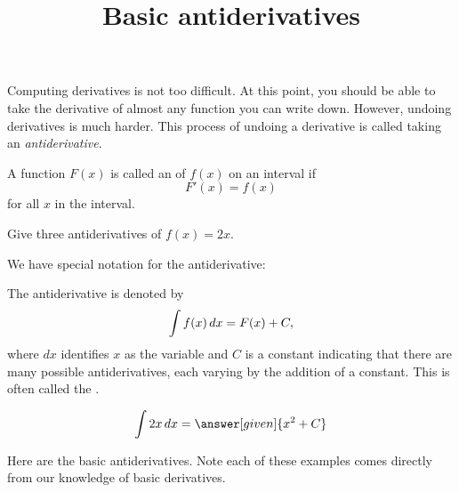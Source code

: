 \documentclass{ximera}
\title[Dig-In:]{Basic antiderivatives}
\begin{document}
\begin{abstract}
\end{abstract}
\maketitle


Computing derivatives is not too difficult. At this point, you should
be able to take the derivative of almost any function you can write
down. However, undoing derivatives is much harder. This process of
undoing a derivative is called taking an \textit{antiderivative}.

\begin{definition}
A function $F(x)$ is called an  of $f(x)$ on an
interval if
\[
F'(x) = f(x)
\]
for all $x$ in the interval.
\end{definition}

\begin{question}
  Give three antiderivatives of $f(x) = 2x$.
\end{question}

We have special notation for the antiderivative:

\begin{definition}
The antiderivative is denoted by
\[
\int f(x) \,d x = F(x)+C,
\]
where $dx$ identifies $x$ as the variable and $C$ is a constant
indicating that there are many possible antiderivatives, each varying by
the addition of a constant.  This is often called the
.
\end{definition}

\begin{example}
  \[
\int 2x \d x = \answer[given]{x^2 + C}%
\]
\end{example}

Here are the basic antiderivatives. Note each of these examples comes
directly from our knowledge of basic derivatives.
\end{document}
